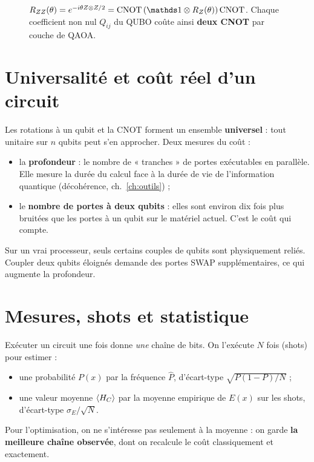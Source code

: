 \begin{figure}[htbp]
\centering
{}
\caption{$R_{ZZ}(\theta)=e^{-i\theta Z\otimes Z/2}=\mathrm{CNOT}\,(\Id\otimes R_Z(\theta))\,\mathrm{CNOT}$. Chaque coefficient non nul $Q_{ij}$ du QUBO coûte ainsi \textbf{deux CNOT} par couche de QAOA.}\label{fig:rzz}
\end{figure}

\section{Universalité et coût réel d'un circuit}
Les rotations à un qubit et la CNOT forment un ensemble \textbf{universel} : tout unitaire sur $n$ qubits peut s'en approcher. Deux mesures du coût :
\begin{itemize}
\item la \textbf{profondeur} : le nombre de « tranches » de portes exécutables en parallèle. Elle mesure la durée du calcul face à la durée de vie de l'information quantique (décohérence, ch.~\ref{ch:outils}) ;
\item le \textbf{nombre de portes à deux qubits} : elles sont environ dix fois plus bruitées que les portes à un qubit sur le matériel actuel. C'est le coût qui compte.
\end{itemize}
Sur un vrai processeur, seuls certains couples de qubits sont physiquement reliés. Coupler deux qubits éloignés demande des portes SWAP supplémentaires, ce qui augmente la profondeur.

\section{Mesures, shots et statistique}
Exécuter un circuit une fois donne \emph{une} chaîne de bits. On l'exécute $N$ fois (shots) pour estimer :
\begin{itemize}
\item une probabilité $P(x)$ par la fréquence $\hat P$, d'écart-type $\sqrt{P(1-P)/N}$ ;
\item une valeur moyenne $\langle H_C\rangle$ par la moyenne empirique de $E(x)$ sur les shots, d'écart-type $\sigma_E/\sqrt N$.
\end{itemize}
Pour l'optimisation, on ne s'intéresse pas seulement à la moyenne : on garde \textbf{la meilleure chaîne observée}, dont on recalcule le coût classiquement et exactement.

